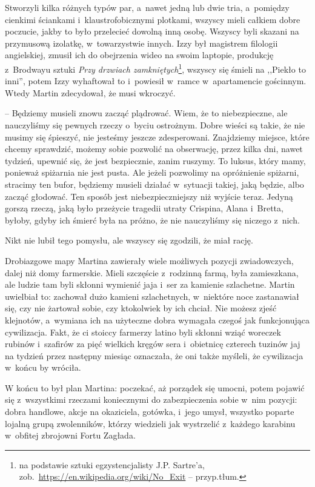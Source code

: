 \documentclass[oneside,polish,11pt,sfheadings]{mwbk}
\begin{document}
Stworzyli kilka różnych typów par, a~nawet jedną lub dwie tria, a~pomiędzy cienkimi ściankami i~klaustrofobicznymi plotkami, wszyscy mieli
całkiem dobre poczucie, jakby to było przelecieć dowolną inną osobę.
Wszyscy byli skazani na przymusową izolatkę, w~towarzystwie innych. Izzy
był magistrem filologii angielskiej, zmusił ich do obejrzenia wideo na
swoim laptopie, produkcję z~Brodwayu sztuki \textit{Przy drzwiach
zamkniętych}\footnote{na podstawie sztuki egzystencjalisty J.P. Sartre'a,
zob.~\url{https://en.wikipedia.org/wiki/No\_Exit} -- przyp.tłum.}, wszyscy się śmieli na ,,Piekło to inni'', potem Izzy
wyhaftował to i~powiesił w~ramce w~apartamencie gościnnym. Wtedy Martin
zdecydował, że musi wkroczyć.

-- Będziemy musieli znowu zacząć plądrować. Wiem, że to niebezpieczne,
ale nauczyliśmy się pewnych rzeczy o~byciu ostrożnym. Dobre wieści są
takie, że nie musimy się śpieszyć, nie jesteśmy jeszcze zdesperowani.
Znajdziemy miejsce, które chcemy sprawdzić, możemy sobie pozwolić na
obserwację, przez kilka dni, nawet tydzień, upewnić się, że jest
bezpiecznie, zanim ruszymy. To luksus, który mamy, ponieważ spiżarnia
nie jest pusta. Ale jeżeli pozwolimy na opróżnienie spiżarni, stracimy
ten bufor, będziemy musieli działać w~sytuacji takiej, jaką będzie, albo
zacząć głodować. Ten sposób jest niebezpieczniejszy niż wyjście teraz.
Jedyną gorszą rzeczą, jaką było przeżycie tragedii utraty Crispina,
Alana i~Bretta, byłoby, gdyby ich śmierć była na próżno, że nie
nauczyliśmy się niczego z~nich.

Nikt nie lubił tego pomysłu, ale wszyscy się zgodzili, że miał rację.

Drobiazgowe mapy Martina zawierały wiele możliwych pozycji zwiadowczych,
dalej niż domy farmerskie. Mieli szczęście z~rodzinną farmą, była
zamieszkana, ale ludzie tam byli skłonni wymienić jaja i~ser za kamienie
szlachetne. Martin uwielbiał to: zachował dużo kamieni szlachetnych, w~niektóre noce zastanawiał się, czy nie żartował sobie, czy ktokolwiek by
ich chciał. Nie możesz zjeść klejnotów, a~wymiana ich na użyteczne dobra
wymagała czegoś jak funkcjonująca cywilizacja. Fakt, że ci stoiccy
farmerzy latino byli skłonni wziąć woreczek rubinów i~szafirów za pięć
wielkich kręgów sera i~obietnicę czterech tuzinów jaj na tydzień przez
następny miesiąc oznaczała, że oni także myśleli, że cywilizacja w~końcu
by wróciła.

W końcu to był plan Martina: poczekać, aż porządek się umocni, potem
pojawić się z~wszystkimi rzeczami koniecznymi do zabezpieczenia sobie w~nim pozycji: dobra handlowe, akcje na okaziciela, gotówka, i~jego umysł,
wszystko poparte lojalną grupą zwolenników, którzy wiedzieli jak
wystrzelić z~każdego karabinu w~obfitej zbrojowni Fortu Zagłada.
\end{document}
